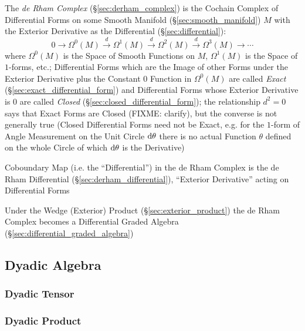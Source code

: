 {{\asterism

The \emph{de Rham Complex} (\S\ref{sec:derham_complex}) is the Cochain Complex
of Differential Forms on some Smooth Manifold (\S\ref{sec:smooth_manifold}) $M$
with the Exterior Derivative as the Differential (\S\ref{sec:differential}):
\[
  0 \rightarrow \Omega^0(M) \xrightarrow{d} \Omega^1(M) \xrightarrow{d}
  \Omega^2(M) \xrightarrow{d} \Omega^3(M) \rightarrow \cdots
\]
where $\Omega^0(M)$ is the Space of Smooth Functions on $M$, $\Omega^1(M)$ is
the Space of $1$-forms, etc.; Differential Forms which are the Image of other
Forms under the Exterior Derivative plus the Constant $0$ Function in
$\Omega^0(M)$ are called \emph{Exact} (\S\ref{sec:exact_differential_form}) and
Differential Forms whose Exterior Derivative is $0$ are called \emph{Closed}
(\S\ref{sec:closed_differential_form}); the relationship $d^2 = 0$ says that
Exact Forms are Closed (FIXME: clarify), but the converse is not generally true
(Closed Differential Forms need not be Exact, e.g. for the $1$-form of Angle
Measurement on the Unit Circle $\mathrm{d}\theta$ there is no actual Function
$\theta$ defined on the whole Circle of which $\mathrm{d}\theta$ is the
Derivative)

Coboundary Map (i.e. the ``Differential'') in the de Rham Complex is the de Rham
Differential (\S\ref{sec:derham_differential}), ``Exterior Derivative'' acting
on Differential Forms

Under the Wedge (Exterior) Product (\S\ref{sec:exterior_product}) the de Rham
Complex becomes a Differential Graded Algebra
(\S\ref{sec:differential_graded_algebra})



\subsection{Dyadic Algebra}\label{sec:dyadic_algebra}

\subsubsection{Dyadic Tensor}\label{sec:dyadic_tensor}

\subsubsection{Dyadic Product}\label{sec:dyadic_product}



}}
